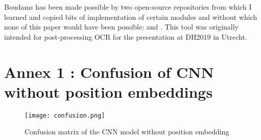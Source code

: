 \documentclass{jdmdh}
\begin{document}
Boudams has been made possible by two open-source repositories from which I learned and copied bits of implementation of certain modules and without which none of this paper would have been possible: \citet{enrique_manjavacas_2019_2654987} and \citet{bentrevett}. This tool was originally intended for post-processing OCR for the presentation \citet{pinchecampsclerice} at DH2019 in Utrecht.






\appendix\footnotesize

\section{Annex 1 : Confusion of CNN without position embeddings}

\begin{figure}[H]
  \centering
  \texttt{[image: confusion.png]}
  \caption{Confusion matrix of the CNN model without position embedding}
  \label{fig:confusion_matrix}
\end{figure}
\end{document}

